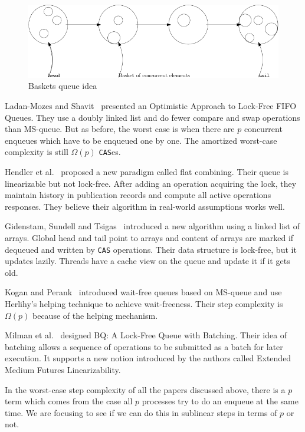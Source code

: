 \documentclass[12pt]{article}
\begin{document}
\begin{figure}[hbt]
  \center\includegraphics[scale=0.3]{pics/baskets}
  \caption{Baskets queue idea}
\end{figure}

Ladan-Mozes and Shavit~\cite{DBLP:journals/dc/Ladan-MozesS08} presented an Optimistic Approach to Lock-Free FIFO Queues. They use a doubly linked list and do fewer compare and swap operations than MS-queue. But as before, the worst case is when there are $p$ concurrent enqueues which have to be enqueued one by one. The amortized worst-case complexity is still $\Omega(p)$ \texttt{CAS}es.

Hendler et al.~\cite{DBLP:conf/spaa/HendlerIST10} proposed a new paradigm called flat combining. Their queue is linearizable but not lock-free. After adding an operation acquiring the lock, they maintain history in publication records and compute all active operations responses. They believe their algorithm in real-world assumptions works well.

Gidenstam, Sundell and Tsigas~\cite{DBLP:conf/opodis/GidenstamST10} introduced a new algorithm using a linked list of arrays. Global head and tail point to arrays and content of arrays are marked if dequeued and written by \texttt{CAS} operations. Their data structure is lock-free, but it updates lazily. Threads have a cache view on the queue and update it if it gets old.

Kogan and Perank~\cite{DBLP:conf/ppopp/KoganP11} introduced wait-free queues based on MS-queue and use Herlihy's helping technique to achieve wait-freeness. Their step complexity is $\Omega(p)$ because of the helping mechanism.

Milman et al.~\cite{DBLP:conf/spaa/MilmanKLLP18} designed BQ: A Lock-Free Queue with Batching. Their idea of batching allows a sequence of operations to be submitted as a batch for later execution. It supports a new notion introduced by the authors called Extended Medium Futures Linearizability.

In the worst-case step complexity of all the papers discussed above, there is a $p$ term which comes from the case all $p$ processes try to do an enqueue at the same time. We are focusing to see if we can do this in sublinear steps in terms of $p$ or not.
\end{document}
